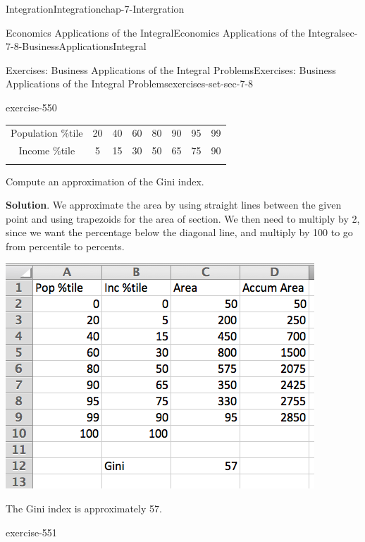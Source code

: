 \documentclass[oneside,10pt,]{book}
\numberwithin{equation}{section}
\newcommand{\hrulethin}  {\noalign{\hrule height 0.04em}}
\newcommand{\hrulemedium}{\noalign{\hrule height 0.07em}}
\newcommand{\hrulethick} {\noalign{\hrule height 0.11em}}
\begin{document}
\begin{chapterptx}{Integration}{}{Integration}{}{}{chap-7-Intergration}
\begin{sectionptx}{Economics Applications of the Integral}{}{Economics Applications of the Integral}{}{}{sec-7-8-BusinessApplicationsIntegral}
\begin{exercises-subsection-numberless}{Exercises: Business Applications of the Integral Problems}{}{Exercises: Business Applications of the Integral Problems}{}{}{exercises-set-sec-7-8}
\begin{divisionexercise}{13}{}{}{exercise-550}
\begin{sidebyside}{1}{0}{0}{0}
\begin{sbspanel}{1}
{\centering%
\begin{tabular}{cccccccc}\hrulethick
Population \%tile&20&40&60&80&90&95&99\tabularnewline\hrulethin
Income \%tile&5&15&30&50&65&75&90\tabularnewline\hrulemedium
\end{tabular}
\par}
\end{sbspanel}%
\end{sidebyside}%
\par
\hypertarget{p-3163}{}%
Compute an approximation of the Gini index.%
\par\smallskip%
\noindent\textbf{Solution}.\hypertarget{solution-278}{}\quad%
\hypertarget{p-3164}{}%
We approximate the area by using straight lines between the given point and using trapezoids for the area of section.  We then need to multiply by 2, since we want the percentage below the diagonal line, and multiply by 100 to go from percentile to percents.%
\begin{sidebyside}{1}{0.2}{0.2}{0}%
\begin{sbspanel}{0.6}%
\includegraphics[width=1\linewidth]{images/sec7-8-sol13a.png}
\end{sbspanel}%
\end{sidebyside}%
\par
\hypertarget{p-3165}{}%
The Gini index is approximately 57.%
\end{divisionexercise}%
\begin{divisionexercise}{14}{}{}{exercise-551}%
\hypertarget{p-3166}{}%

\end{divisionexercise}
\end{exercises-subsection-numberless}
\end{sectionptx}
\end{chapterptx}
\end{document}
